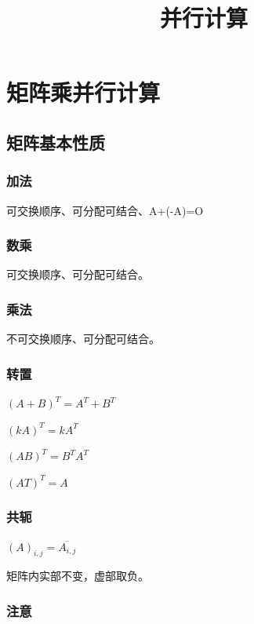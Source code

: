 \documentclass[UTF8]{article}%
\begin{document}

\title{并行计算}%
\maketitle%

\newpage
\tableofcontents

\section{矩阵乘并行计算}

\subsection{矩阵基本性质}

\subsubsection{加法}

可交换顺序、可分配可结合、A+(-A)=O

\subsubsection{数乘}

可交换顺序、可分配可结合。

\subsubsection{乘法}

不可交换顺序、可分配可结合。

\subsubsection{转置}

$(A+B)^T=A^T+B^T$

$(kA)^T=kA^T$

$(AB)^T=B^{T}A^T$

$(AT)^T=A$

\subsubsection{共轭}

$(A)_{i,j}=\overline{A_{i,j}}$

矩阵内实部不变，虚部取负。

\subsubsection{注意}
\end{document}
